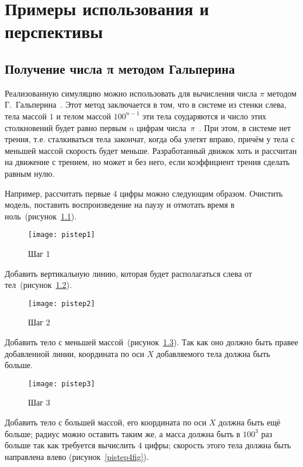 \chapter{Примеры использования и перспективы}\label{chapter-usage}

\section{Получение числа π методом Гальперина}\label{pipool}

Реализованную симуляцию можно использовать для вычисления числа \(\pi\)
методом Г.~Гальперина~\cite{poolpi}.
Этот метод заключается в том, что в системе из стенки слева,
тела массой \(1\) и телом массой \(100^{n - 1}\) эти тела соударяются и число этих столкновений
будет равно первым \(n\) цифрам числа~\(\pi\)~\cite{habrpi}.
При этом, в системе нет трения, т.е. сталкиваться тела закончат, когда оба улетят вправо, причём у тела с меньшей массой скорость будет меньше.
Разработанный движок хоть и рассчитан на движение с трением, но может и без него, если коэффициент трения сделать равным нулю.

Например, рассчитать первые 4 цифры можно следующим образом.
Очистить модель, поставить воспроизведение на паузу и отмотать время в ноль~(рисунок~\ref{pistep1fig}).

\begin{figure}[H]
    \centering
    \texttt{[image: pistep1]}
    \caption{Шаг 1\label{pistep1fig}}
\end{figure}

Добавить вертикальную линию, которая будет располагаться слева от тел~(рисунок~\ref{pistep2fig}).

\begin{figure}[H]
    \centering
    \texttt{[image: pistep2]}
    \caption{Шаг 2\label{pistep2fig}}
\end{figure}

Добавить тело с меньшей массой~(рисунок~\ref{pistep3fig}).
Так как оно должно быть правее добавленной линии, координата по оси \(X\)
добавляемого тела должна быть больше.

\begin{figure}[H]
    \centering
    \texttt{[image: pistep3]}
    \caption{Шаг 3\label{pistep3fig}}
\end{figure}

Добавить тело с большей массой, его координата по оси \(X\) должна быть ещё больше;
радиус можно оставить таким же, а масса должна быть в \(100^3\) раз больше так как требуется вычислить 4 цифры;
скорость этого тела должна быть направлена влево (рисунок~\ref{pistep4fig}).

